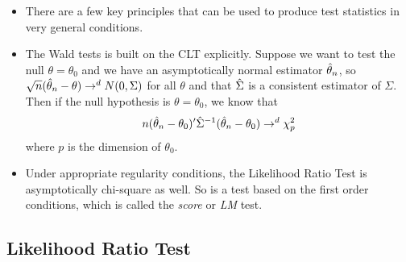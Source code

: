 \begin{itemize}[leftmargin=0pt]

\item There are a few key principles that can be used to produce test
  statistics in very general conditions.

\item The Wald tests is built on the CLT explicitly.  Suppose we want
  to test the null $\theta = \theta_0$ and we have an asymptotically normal
  estimator $\hat{\theta}_n$, so $\sqrt{n} (\hat{\theta}_n - \theta) \to^d N(0,\Sigma)$ for all $\theta$
  and that $\hat{\Sigma}$ is a consistent estimator of $\Sigma$.  Then if the null
  hypothesis is $\theta = \theta_0$, we know that
  \begin{equation*}
    n (\hat{\theta}_n - \theta_0)' \hat{\Sigma}^{-1} (\hat{\theta}_n - \theta_0) \to^d \chi^2_p
  \end{equation*}
  where $p$ is the dimension of $\theta_0$.

\item Under appropriate regularity conditions, the Likelihood Ratio
  Test is asymptotically chi-square as well.  So is a test based on
  the first order conditions, which is called the \emph{score} or
  \emph{LM} test.

\end{itemize}

\subsection{Likelihood Ratio Test}

